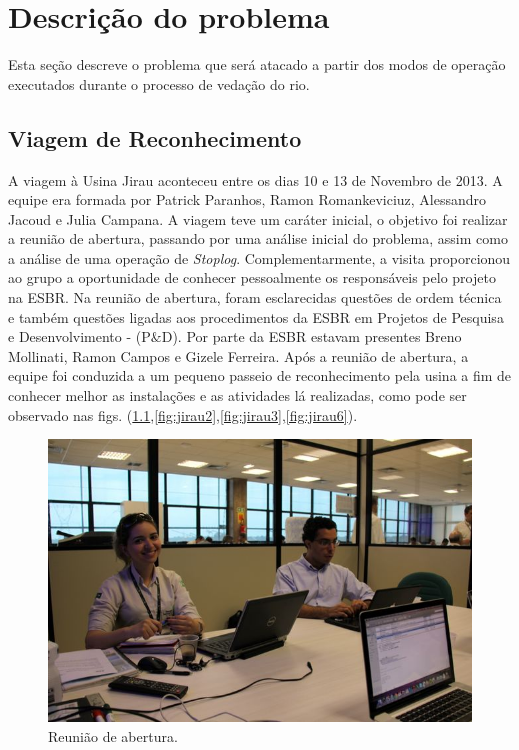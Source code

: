 

\chapter{Descrição do problema}
Esta seção descreve o problema que será atacado a partir dos modos de operação
executados durante o processo de vedação do rio.

\section{Viagem de Reconhecimento}
A viagem à Usina Jirau aconteceu entre os dias 10 e 13 de Novembro de 2013. A
equipe era formada por Patrick Paranhos, Ramon Romankeviciuz, Alessandro
Jacoud e Julia Campana. A viagem teve um caráter inicial, o objetivo foi realizar a
reunião de abertura, passando por  uma análise inicial do problema, assim como a
análise de uma operação de \emph{Stoplog}. Complementarmente, a visita proporcionou ao
grupo a oportunidade de conhecer pessoalmente os responsáveis pelo projeto na
ESBR.
Na reunião de abertura, foram esclarecidas questões de ordem técnica e também
questões ligadas aos procedimentos da ESBR em Projetos de Pesquisa e Desenvolvimento -
(P$\&$D).  Por parte da ESBR estavam presentes Breno Mollinati, Ramon Campos e
Gizele Ferreira. Após a reunião de abertura, a equipe foi conduzida a um
pequeno passeio de reconhecimento pela usina a fim de conhecer melhor as
instalações e as atividades lá realizadas, como pode ser observado nas
figs.
(\ref{fig:jirau1},\ref{fig:jirau2},\ref{fig:jirau3},\ref{fig:jirau6}).

 \begin{figure}[ht!]
    \centering \includegraphics[width=0.6\columnwidth]{figs/jirau/jirau_01}
    \caption{Reunião de abertura.}
    \label{fig:jirau1}
\end{figure}


